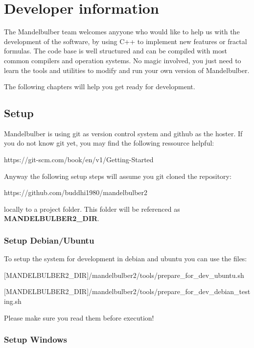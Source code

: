 \pagebreak

\section{Developer information}\label{developers}

The Mandelbulber team welcomes anyyone who would like to help us with the development of the software, by using C++ to implement new features or fractal formulas.
The code base is well structured and can be compiled with most common compilers and operation systems.
No magic involved, you just need to learn the tools and utilities to modify and run your own version of Mandelbulber.

The following chapters will help you get ready for development.

\subsection{Setup}\label{developers-setup}

Mandelbulber is using git as version control system and github as the hoster.
If you do not know git yet, you may find the following ressource helpful: 

https://git-scm.com/book/en/v1/Getting-Started

Anyway the following setup steps will assume you git cloned the repository:

https://github.com/buddhi1980/mandelbulber2

locally to a project folder. This folder will be referenced as \textbf{MANDELBULBER2\_DIR}.

\subsubsection{Setup Debian/Ubuntu}\label{developers-setup-debian-and-ubuntu}

To setup the system for development in debian and ubuntu you can use the files: 

[MANDELBULBER2\_DIR]/mandelbulber2/tools/prepare\_for\_dev\_ubuntu.sh

[MANDELBULBER2\_DIR]/mandelbulber2/tools/prepare\_for\_dev\_debian\_testing.sh

Please make sure you read them before execution!

\subsubsection{Setup Windows}\label{developers-setup-windows}


